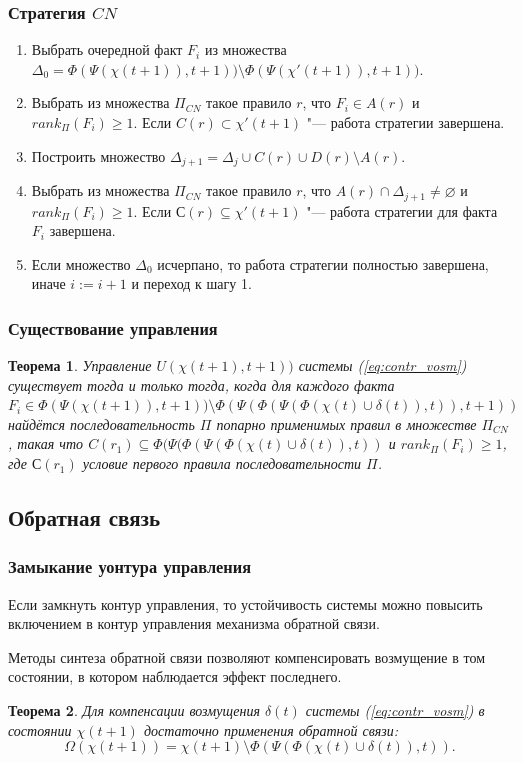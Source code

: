 \documentclass[default]{beamer}
\newtheorem{Theorem}{Теорема}
\begin{document}
	\begin{frame}
		\frametitle{Стратегия $CN$}
		
		\begin{enumerate}
			\item Выбрать очередной факт $F_i$ из множества  $\Delta_0 = \Phi(\Psi(\chi(t+1)),t+1))\setminus \Phi(\Psi(\chi'(t+1)),t+1))$.
			\item Выбрать из множества $\Pi_{CN}$ такое правило $r$, что $F_i\in A(r)$ и $rank_{\Pi}(F_i)\geqslant 1$. Если $C(r)\subset\chi'(t+1)$ "--- работа стратегии завершена.
			\item Построить множество $\Delta_{j+1} = \Delta_j \cup C(r)\cup D(r)\setminus A(r)$.
			\item Выбрать из множества $\Pi_{CN}$ такое правило $r$, что $A(r)\cap\Delta_{j+1}\not=\varnothing$ и $rank_{\Pi}(F_i)\geqslant 1$. Если $С(r)\subseteq\chi'(t+1)$ "--- работа стратегии для факта $F_i$ завершена.
			\item Если множество $\Delta_0$ исчерпано, то работа стратегии полностью завершена, иначе $i := i+1$ и переход к шагу 1.
		\end{enumerate}
	\end{frame}	

	\begin{frame}
		\frametitle{Существование управления}
		
		\begin{Theorem}
			Управление $U(\chi(t+1),t+1))$ системы (\ref*{eq:contr_vosm}) существует тогда и только тогда, когда для каждого факта $F_i\in\Phi(\Psi(\chi(t+1)),t+1))\setminus\Phi(\Psi(\Phi(\Psi(\Phi(\chi(t)\cup\delta(t)),t)), t+1))$ найдётся последовательность $\Pi$ попарно применимых правил в множестве $\Pi_{CN}$, такая что $C(r_1)\subseteq\Phi(\Psi(\Phi(\Psi(\Phi(\chi(t)\cup\delta(t)),t))$ и $rank_{\Pi}(F_i)\geqslant 1$, где $С(r_1)$ условие первого правила последовательности $\Pi$.
		\end{Theorem}
	\end{frame}

	\subsection{Обратная связь}

	\begin{frame}
		\frametitle{Замыкание уонтура управления}
		
		Если замкнуть контур управления, то устойчивость системы можно повысить включением в контур управления механизма обратной связи.
		\par\bigskip
		Методы синтеза обратной связи позволяют компенсировать возмущение в том состоянии, в котором наблюдается эффект последнего.
		
		\begin{Theorem}
			Для компенсации возмущения $\delta(t)$ системы (\ref{eq:contr_vosm})  в состоянии $\chi(t+1)$ достаточно применения обратной связи:
			\begin{equation}
				\Omega(\chi(t+1)) = \chi(t+1) \setminus \Phi(\Psi(\Phi(\chi(t)\cup\delta(t)),t)).
			\end{equation}
		\end{Theorem}
	\end{frame}
	
\end{document}
